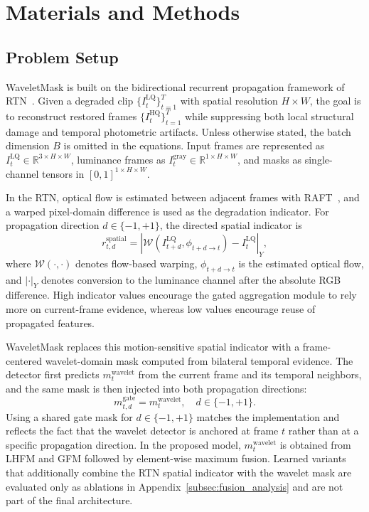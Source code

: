 \section{Materials and Methods}\label{sec:method}

\subsection{Problem Setup}\label{subsec:problem_setup}

WaveletMask is built on the bidirectional recurrent propagation framework of RTN~\cite{rtn2022}. Given a degraded clip $\{I_t^{\mathrm{LQ}}\}_{t=1}^{T}$ with spatial resolution $H\times W$, the goal is to reconstruct restored frames $\{I_t^{\mathrm{HQ}}\}_{t=1}^{T}$ while suppressing both local structural damage and temporal photometric artifacts. Unless otherwise stated, the batch dimension $B$ is omitted in the equations. Input frames are represented as $I_t^{\mathrm{LQ}}\in\mathbb{R}^{3\times H\times W}$, luminance frames as $I_t^{\mathrm{gray}}\in\mathbb{R}^{1\times H\times W}$, and masks as single-channel tensors in $[0,1]^{1\times H\times W}$.

In the RTN, optical flow is estimated between adjacent frames with RAFT~\cite{teed2020raft}, and a warped pixel-domain difference is used as the degradation indicator. For propagation direction $d\in\{-1,+1\}$, the directed spatial indicator is
\begin{equation}\label{eq:baseline_indicator}
    r_{t,d}^{\mathrm{spatial}} = \left|\mathcal{W}\!\left(I_{t+d}^{\mathrm{LQ}},\phi_{t+d\to t}\right)-I_t^{\mathrm{LQ}}\right|_{Y},
\end{equation}
where $\mathcal{W}(\cdot,\cdot)$ denotes flow-based warping, $\phi_{t+d\to t}$ is the estimated optical flow, and $|\cdot|_{Y}$ denotes conversion to the luminance channel after the absolute RGB difference. High indicator values encourage the gated aggregation module to rely more on current-frame evidence, whereas low values encourage reuse of propagated features.

WaveletMask replaces this motion-sensitive spatial indicator with a frame-centered wavelet-domain mask computed from bilateral temporal evidence. The detector first predicts $m_t^{\mathrm{wavelet}}$ from the current frame and its temporal neighbors, and the same mask is then injected into both propagation directions:
\begin{equation}\label{eq:gate_mask}
    m_{t,d}^{\mathrm{gate}} = m_t^{\mathrm{wavelet}}, \quad d\in\{-1,+1\}.
\end{equation}
Using a shared gate mask for $d\in\{-1,+1\}$ matches the implementation and reflects the fact that the wavelet detector is anchored at frame $t$ rather than at a specific propagation direction. In the proposed model, $m_t^{\mathrm{wavelet}}$ is obtained from LHFM and GFM followed by element-wise maximum fusion. Learned variants that additionally combine the RTN spatial indicator with the wavelet mask are evaluated only as ablations in Appendix~\ref{subsec:fusion_analysis} and are not part of the final architecture.

